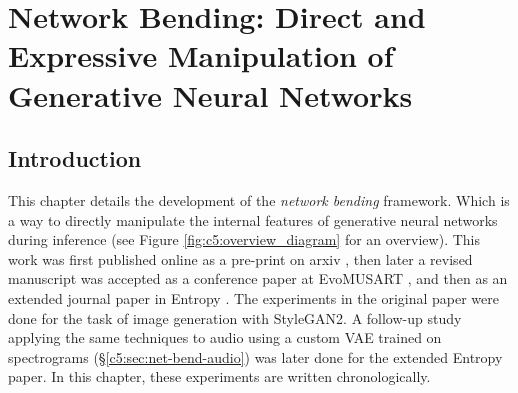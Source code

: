 \chapter{Network Bending: Direct and Expressive Manipulation of Generative Neural Networks}
\label{ch:net_bend}

\section{Introduction}

This chapter details the development of the \textit{network bending} framework. Which is a way to directly manipulate the internal features of generative neural networks during inference (see Figure \ref{fig:c5:overview_diagram} for an overview). This work was first published online as a pre-print on arxiv \citep{broad2020network}, then later a revised manuscript was accepted as a conference paper at EvoMUSART \citep{broad2021network}, and then as an extended journal paper in Entropy \citep{broad2022network}.
The experiments in the original paper were done for the task of image generation with StyleGAN2. 
A follow-up study applying the same techniques to audio using a custom VAE trained on spectrograms (\S \ref{c5:sec:net-bend-audio}) was later done for the extended Entropy paper. 
In this chapter, these experiments are written chronologically.


